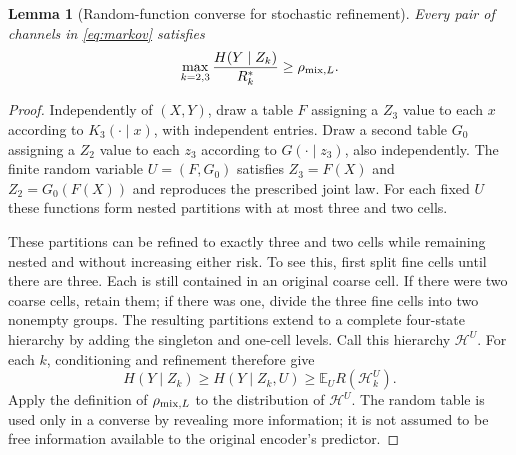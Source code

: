 \documentclass[11pt]{article}
\newtheorem{lemma}[theorem]{Lemma}
\theoremstyle{remark}\newtheorem{remark}[theorem]{Remark}
\newcommand{\E}{\mathbb E}
\newcommand{\cH}{\mathcal H}
\begin{document}
\begin{lemma}[Random-function converse for stochastic refinement]
\label{lem:stoch-lower}
Every pair of channels in \eqref{eq:markov} satisfies
\[
 \max_{k=2,3}\frac{H(Y\mid Z_k)}{R_k^*}\ge\rho_{{\rm mix},L}.
\]
\end{lemma}
\begin{proof}
Independently of $(X,Y)$, draw a table $F$ assigning a $Z_3$ value to
each $x$ according to $K_3(\cdot\mid x)$, with independent entries.
Draw a second table $G_0$ assigning a $Z_2$ value to each $z_3$ according
to $G(\cdot\mid z_3)$, also independently. The finite random variable
$U=(F,G_0)$ satisfies $Z_3=F(X)$ and $Z_2=G_0(F(X))$ and reproduces
the prescribed joint law. For each fixed $U$ these functions form nested
partitions with at most three and two cells.

These partitions can be refined to exactly three and two cells while
remaining nested and without increasing either risk. To see this, first
split fine cells until there are three. Each is still contained in an
original coarse cell. If there were two coarse cells, retain them; if
there was one, divide the three fine cells into two nonempty groups.
The resulting partitions extend to a complete four-state hierarchy by
adding the singleton and one-cell levels. Call this hierarchy $\cH^U$.
For each $k$, conditioning and refinement therefore give
\[
 H(Y\mid Z_k)\ge H(Y\mid Z_k,U)
   \ge\E_U R(\cH_k^U).
\]
Apply the definition of $\rho_{{\rm mix},L}$ to the distribution of
$\cH^U$. The random table is used only in a converse by revealing more
information; it is not assumed to be free information available to the
original encoder's predictor.
\end{proof}
\end{document}
